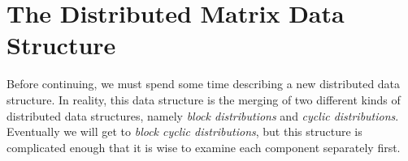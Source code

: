 \chapter{The Distributed Matrix Data Structure}
\label{chap:dmat}

Before continuing, we must spend some time describing a new distributed data 
structure.  In reality, this data structure is the merging of two different 
kinds of distributed data structures, namely \emph{block distributions} and 
\emph{cyclic distributions}.  Eventually we will get to \emph{block cyclic 
distributions}, but this structure is complicated enough that it is wise to 
examine each component separately first.

